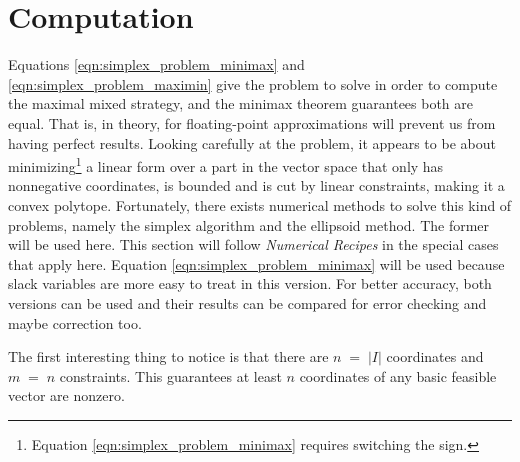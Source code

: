\documentclass{report}
\theoremstyle{definition}
\theoremstyle{plain}
\begin{document}
\section{Computation}
Equations \ref{eqn:simplex_problem_minimax} and
\ref{eqn:simplex_problem_maximin} give the problem to solve in order to
compute the maximal mixed strategy, and the minimax theorem guarantees both are
equal. That is, in theory, for floating-point approximations will prevent us
from having perfect results. Looking carefully at the problem, it appears to be
about minimizing\footnote{Equation \ref{eqn:simplex_problem_minimax} requires
switching the sign.} a linear form over a part in the vector space that only
has nonnegative coordinates, is bounded and is cut by linear constraints,
making it a convex polytope. Fortunately, there exists numerical methods to
solve this kind of problems, namely the simplex algorithm and the ellipsoid
method. The former will be used here. This section will follow \emph{Numerical
Recipes}\cite{num_rec} in the special cases that apply here. Equation
\ref{eqn:simplex_problem_minimax} will be used because slack variables are more
easy to treat in this version. For better accuracy, both versions can be used
and their results can be compared for error checking and maybe correction too.

The first interesting thing to notice is that there are $n\;=\;\left|I\right|$
coordinates and $m\;=\;n$ constraints. This guarantees at least $n$ coordinates
of any basic feasible vector are nonzero.
\end{document}
